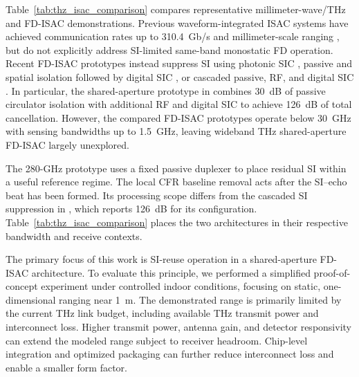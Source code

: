 \documentclass[10pt,journal]{IEEEtran}
\DeclareRobustCommand{\rev}[1]{\textcolor{revisioncolor}{#1}}
\begin{document}
Table~\ref{tab:thz_isac_comparison} compares representative
millimeter-wave/THz and FD-ISAC demonstrations. Previous
waveform-integrated ISAC systems have achieved communication rates up
to 310.4~Gb/s and millimeter-scale ranging
\cite{lyu_multichannel_2024,shi_310_2026a}, but do not explicitly
address SI-limited same-band monostatic FD operation. Recent FD-ISAC
prototypes instead suppress SI using photonic SIC
\cite{yu_photonicsassisted_2024a}, passive and spatial isolation
followed by digital SIC \cite{duan_inband_2025}, or cascaded passive,
RF, and digital SIC \cite{du_fullduplex_2026}. In particular, the
shared-aperture prototype in \cite{du_fullduplex_2026} combines
30~dB of passive circulator isolation with additional RF and digital
SIC to achieve 126~dB of total cancellation. However, the compared
FD-ISAC prototypes operate below 30~GHz with sensing bandwidths up to
1.5~GHz, leaving wideband THz shared-aperture FD-ISAC largely
unexplored.

\rev{The 280-GHz prototype uses a fixed passive duplexer to place
residual SI within a useful reference regime. The local CFR
baseline removal acts after the SI--echo beat has been formed.
Its processing scope differs from the cascaded SI suppression
in \cite{du_fullduplex_2026}, which reports 126~dB for its
configuration. Table~\ref{tab:thz_isac_comparison} places the
two architectures in their respective bandwidth and receive
contexts.}

The primary focus of this work is SI-reuse operation in a
shared-aperture FD-ISAC architecture. To evaluate this principle, we performed a simplified proof-of-concept
experiment under controlled indoor conditions, focusing on static,
one-dimensional ranging near 1~m. The demonstrated range is
primarily limited by the current THz
link budget, including available THz transmit power and interconnect
loss. \rev{Higher transmit power, antenna gain, and detector responsivity
can extend the modeled range subject to receiver headroom.} Chip-level
integration and optimized packaging can further reduce interconnect
loss and enable a smaller form factor.
\end{document}
